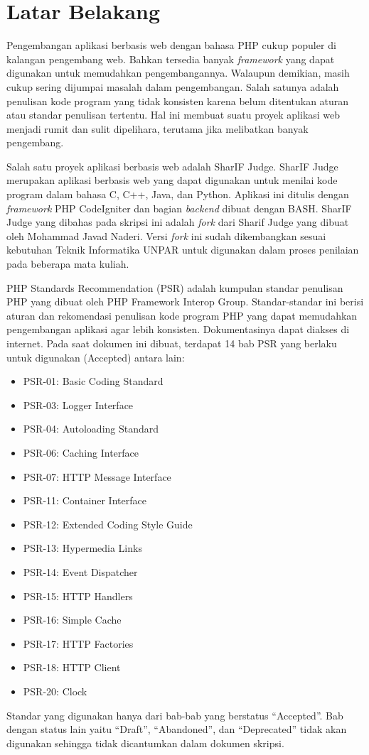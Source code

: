 \documentclass[a4paper,twoside]{article}
\begin{document}
\section{Latar Belakang}
Pengembangan aplikasi berbasis web dengan bahasa PHP cukup populer di kalangan pengembang web. Bahkan tersedia banyak \textit{framework} yang dapat digunakan untuk memudahkan pengembangannya. Walaupun demikian, masih cukup sering dijumpai masalah dalam pengembangan. Salah satunya adalah penulisan kode program yang tidak konsisten karena belum ditentukan aturan atau standar penulisan tertentu. Hal ini membuat suatu proyek aplikasi web menjadi rumit dan sulit dipelihara, terutama jika melibatkan banyak pengembang. 

Salah satu proyek aplikasi berbasis web adalah SharIF Judge. SharIF Judge merupakan aplikasi berbasis web yang dapat digunakan untuk menilai kode program dalam bahasa C, C++, Java, dan Python. Aplikasi ini ditulis dengan  \textit{framework} PHP CodeIgniter dan bagian \textit{backend} dibuat dengan BASH. SharIF Judge yang dibahas pada skripsi ini adalah \textit{fork} dari Sharif Judge yang dibuat oleh Mohammad Javad Naderi. Versi \textit{fork} ini sudah dikembangkan sesuai kebutuhan Teknik Informatika UNPAR untuk digunakan dalam proses penilaian pada beberapa mata kuliah. 

PHP Standards Recommendation (PSR) adalah kumpulan standar penulisan PHP yang dibuat oleh PHP Framework Interop Group. Standar-standar ini berisi aturan dan rekomendasi penulisan kode program PHP yang dapat memudahkan pengembangan aplikasi agar lebih konsisten. Dokumentasinya dapat diakses di internet. Pada saat dokumen ini dibuat, terdapat 14 bab PSR yang berlaku untuk digunakan (Accepted) antara lain:
\begin{itemize}
	\item PSR-01: Basic Coding Standard
	\item PSR-03: Logger Interface
	\item PSR-04: Autoloading Standard
	\item PSR-06: Caching Interface
	\item PSR-07: HTTP Message Interface
	\item PSR-11: Container Interface
	\item PSR-12: Extended Coding Style Guide
	\item PSR-13: Hypermedia Links
	\item PSR-14: Event Dispatcher
	\item PSR-15: HTTP Handlers
	\item PSR-16: Simple Cache
	\item PSR-17: HTTP Factories
	\item PSR-18: HTTP Client
	\item PSR-20: Clock
\end{itemize}
Standar yang digunakan hanya dari bab-bab yang berstatus ``Accepted''. Bab dengan status lain yaitu ``Draft'', ``Abandoned'', dan ``Deprecated'' tidak akan digunakan sehingga tidak dicantumkan dalam dokumen skripsi.
\end{document}

